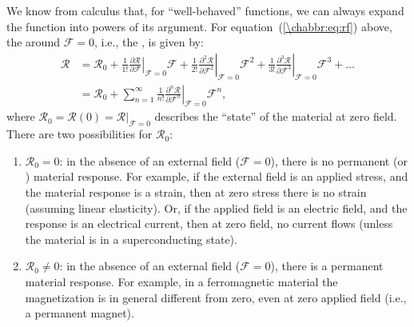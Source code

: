 We know from calculus that, for ``well-behaved'' functions, we can always expand the function into powers of its argument. For equation~(\ref{\chabbr:eq:rf}) above, the  around $\mathcal{F}=0$, i.e., the , is given by:
\begin{align}
	\mathcal{R}&=\mathcal{R}_0 + 
	\frac{1}{1!}\left.\frac{\partial\mathcal{R}}{\partial\mathcal{F}}\right 
	\vert_{\mathcal{F}=0}\!\!\!\!\mathcal{F} + 
	\frac{1}{2!}\left.\frac{\partial^2\mathcal{R}}{\partial\mathcal{F}^2}\right 
	\vert_{\mathcal{F}=0}\!\!\!\!\mathcal{F}^2 + 
	\frac{1}{3!}\left.\frac{\partial^3\mathcal{R}}{\partial\mathcal{F}^3}\right 
	\vert_{\mathcal{F}=0}\!\!\!\!\mathcal{F}^3 + \ldots \nonumber\\
	&= \mathcal{R}_0 +
	\sum_{n=1}^{\infty}\frac{1}{n!}\left.\frac{\partial^n\mathcal{R}}{\partial\mathcal{F}^n}\right 
	\vert_{\mathcal{F}=0}\!\!\!\!\mathcal{F}^n,
	\label{\chabbr:eq:expansion}
\end{align}
where $\mathcal{R}_0 = \mathcal{R}(0)=\mathcal{R}\vert_{\mathcal{F}=0}$ describes the ``state'' of the material at zero field.  There are two possibilities for $\mathcal{R}_0$:
\begin{enumerate}
	\item $\mathcal{R}_0=0$: in the absence of an external field ($\mathcal{F}=0$), there is no permanent (or ) material response.  For example, if the external field is an applied stress, and the material response is a strain, then at zero stress there is no strain (assuming linear elasticity).  Or, if the applied field is an electric field, and the response is an electrical current, then at zero field, no current flows (unless the material is in a superconducting state).
	
	\item $\mathcal{R}_0\neq 0$: in the absence of an external field ($\mathcal{F}=0$), there is a permanent material response.  For example, in a ferromagnetic material the magnetization is in general different from zero, even at zero applied field (i.e., a permanent magnet).  
\end{enumerate}

